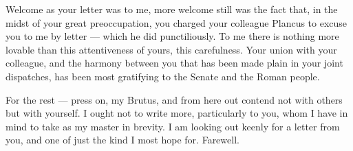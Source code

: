 

 Welcome as your letter was to me, more welcome still was the fact that, in the midst of your great preoccupation, you charged your colleague Plancus to excuse you to me by letter --- which he did punctiliously. To me there is nothing more lovable than this attentiveness of yours, this carefulness. Your union with your colleague, and the harmony between you that has been made plain in your joint dispatches, has been most gratifying to the Senate and the Roman people.

 For the rest --- press on, my Brutus, and from here out contend not with others but with yourself. I ought not to write more, particularly to you, whom I have in mind to take as my master in brevity. I am looking out keenly for a letter from you, and one of just the kind I most hope for. Farewell.
